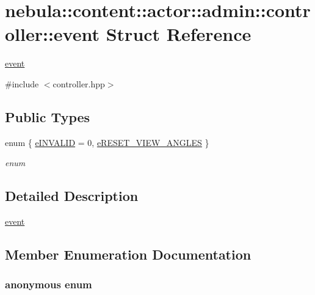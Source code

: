 \hypertarget{structnebula_1_1content_1_1actor_1_1admin_1_1controller_1_1event}{
\section{nebula::content::actor::admin::controller::event Struct Reference}
\label{structnebula_1_1content_1_1actor_1_1admin_1_1controller_1_1event}
}


\hyperlink{structnebula_1_1content_1_1actor_1_1admin_1_1controller_1_1event}{event}  


{\ttfamily \#include $<$controller.hpp$>$}\subsection*{Public Types}
\begin{DoxyCompactItemize}
\item 
enum \{ \hyperlink{structnebula_1_1content_1_1actor_1_1admin_1_1controller_1_1event_afeb4c9ab15a0355b76b9ccf091123abca47a87495656e94c14f67f7783ad5296d}{eINVALID} =  0, 
\hyperlink{structnebula_1_1content_1_1actor_1_1admin_1_1controller_1_1event_afeb4c9ab15a0355b76b9ccf091123abca8dcac8d2df79d90512a09ace0013100f}{eRESET\_\-VIEW\_\-ANGLES}
 \}
\begin{DoxyCompactList}\small\item\em enum \item\end{DoxyCompactList}\end{DoxyCompactItemize}


\subsection{Detailed Description}
\hyperlink{structnebula_1_1content_1_1actor_1_1admin_1_1controller_1_1event}{event} 

\subsection{Member Enumeration Documentation}
\hypertarget{structnebula_1_1content_1_1actor_1_1admin_1_1controller_1_1event_afeb4c9ab15a0355b76b9ccf091123abc}{
\subsubsection[{"@2}]{\setlength{\rightskip}{0pt plus 5cm}anonymous enum}}
\label{structnebula_1_1content_1_1actor_1_1admin_1_1controller_1_1event_afeb4c9ab15a0355b76b9ccf091123abc}



